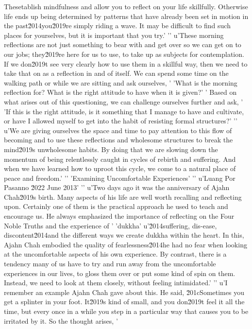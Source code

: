 Thesetablish mindfulness and allow you to reflect on your life skillfully. Otherwise life ends up being determined by patterns that have already been set in motion in the past\u2014you\u2019re simply riding a wave. It may be difficult to find such places for yourselves, but it is important that you try.'
'\n'
u'These morning reflections are not just something to bear with and get over so we can get on to our jobs; they\u2019re here for us to use, to take up as subjects for contemplation. If we don\u2019t see very clearly how to use them in a skillful way, then we need to take that on as a reflection in and of itself. We can spend some time on the walking path or while we are sitting and ask ourselves, '
'What is the morning reflection for? What is the right attitude to have when it is given?'
' Based on what arises out of this questioning, we can challenge ourselves further and ask, '
'If this is the right attitude, is it something that I manage to have and cultivate, or have I allowed myself to get into the habit of resisting formal structures?'
'\n'
u'We are giving ourselves the space and time to pay attention to this flow of becoming and to use these reflections and wholesome structures to break the mind\u2019s unwholesome habits. By doing that we are slowing down the momentum of being relentlessly caught in cycles of rebirth and suffering. And when we have learned how to uproot this cycle, we come to a natural place of peace and freedom.'
'\n'
'Examining Uncomfortable Experiences'
'\n'
u'Luang Por Pasanno \u2022 June 2013'
'\n'
u'Two days ago it was the anniversary of Ajahn Chah\u2019s birth. Many aspects of his life are well worth recalling and reflecting upon. Certainly one of them is the practical approach he used to teach and encourage us. He always emphasized the importance of reflecting on the Four Noble Truths and the experience of '
'dukkha'
u'\u2014suffering, dis-ease, discontent\u2014and the different ways we create dukkha within the heart. In this, Ajahn Chah embodied the quality of fearlessness\u2014he had no fear when looking at the uncomfortable aspects of his own experience. By contrast, there is a tendency many of us have to try and run away from the uncomfortable experiences in our lives, to gloss them over or put some kind of spin on them. Instead, we need to look at them closely, without feeling intimidated.'
'\n'
u'I remember an example Ajahn Chah gave about this. He said, \u201cSometimes you get a splinter in your foot. It\u2019s kind of small, and you don\u2019t feel it all the time, but every once in a while you step in a particular way that causes you to be irritated by it. So the thought arises, '
